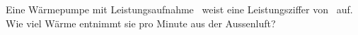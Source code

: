 Eine Wärmepumpe mit Leistungsaufnahme \PwpO\ weist eine Leistungsziffer von \ewpO\ auf. Wie viel Wärme entnimmt sie pro Minute aus der Aussenluft?
